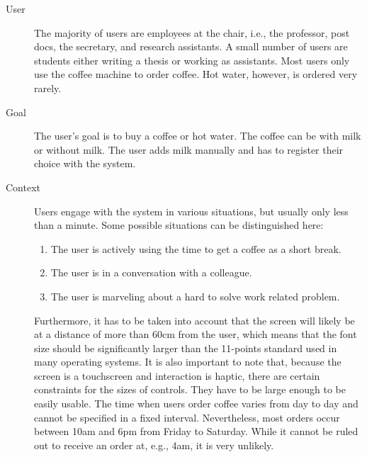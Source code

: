 \documentclass[12pt]{article}
\begin{document}
\begin{description}
  \item [User]
        The majority of users are employees at the chair, i.e., the professor, post docs, the secretary, and research assistants.
        A small number of users are students either writing a thesis or working as assistants.
        Most users only use the coffee machine to order coffee. Hot water, however, is ordered very rarely.

  \item [Goal]
        The user's goal is to buy a coffee or hot water.
        The coffee can be with milk or without milk.
        The user adds milk manually and has to register their choice with the system.

  \item [Context]
        Users engage with the system in various situations, but usually only less than a minute.
        Some possible situations can be distinguished here:
        \begin{enumerate}
          \item The user is actively using the time to get a coffee as a short break.
          \item The user is in a conversation with a colleague.
          \item The user is marveling about a hard to solve work related problem.
        \end{enumerate}
        Furthermore, it has to be taken into account that the screen will likely be at a distance of more than 60cm from the user,
        which means that the font size should be significantly larger than the 11-points standard used in many operating systems. 
        It is also important to note that, because the screen is a touchscreen
        and interaction is haptic, there are certain constraints for the sizes of controls. 
        They have to be large enough to be easily usable.
        The time when users order coffee varies from day to day and cannot be specified in a fixed interval.
        Nevertheless, most orders occur between 10am and 6pm from Friday to Saturday.
        While it cannot be ruled out to receive an order at, e.g., 4am, it is very unlikely.



\end{description}
\end{document}
